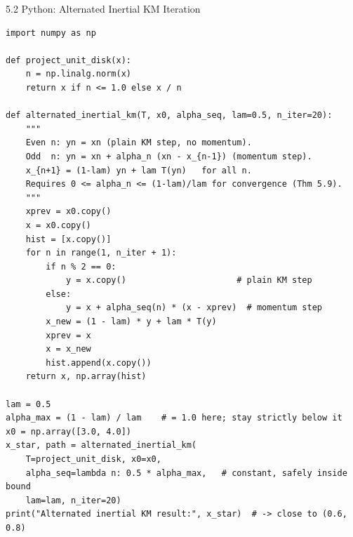 \documentclass[aspectratio=169,10pt]{beamer}
\begin{document}
\begin{frame}[fragile]{5.2 Python: Alternated Inertial KM Iteration}
\begin{lstlisting}[caption={Alternated inertial KM iteration (Python/NumPy)}]
import numpy as np

def project_unit_disk(x):
    n = np.linalg.norm(x)
    return x if n <= 1.0 else x / n

def alternated_inertial_km(T, x0, alpha_seq, lam=0.5, n_iter=20):
    """
    Even n: yn = xn (plain KM step, no momentum).
    Odd  n: yn = xn + alpha_n (xn - x_{n-1}) (momentum step).
    x_{n+1} = (1-lam) yn + lam T(yn)   for all n.
    Requires 0 <= alpha_n <= (1-lam)/lam for convergence (Thm 5.9).
    """
    xprev = x0.copy()
    x = x0.copy()
    hist = [x.copy()]
    for n in range(1, n_iter + 1):
        if n % 2 == 0:
            y = x.copy()                      # plain KM step
        else:
            y = x + alpha_seq(n) * (x - xprev)  # momentum step
        x_new = (1 - lam) * y + lam * T(y)
        xprev = x
        x = x_new
        hist.append(x.copy())
    return x, np.array(hist)

lam = 0.5
alpha_max = (1 - lam) / lam    # = 1.0 here; stay strictly below it
x0 = np.array([3.0, 4.0])
x_star, path = alternated_inertial_km(
    T=project_unit_disk, x0=x0,
    alpha_seq=lambda n: 0.5 * alpha_max,   # constant, safely inside bound
    lam=lam, n_iter=20)
print("Alternated inertial KM result:", x_star)  # -> close to (0.6, 0.8)
\end{lstlisting}
\end{frame}
\end{document}
